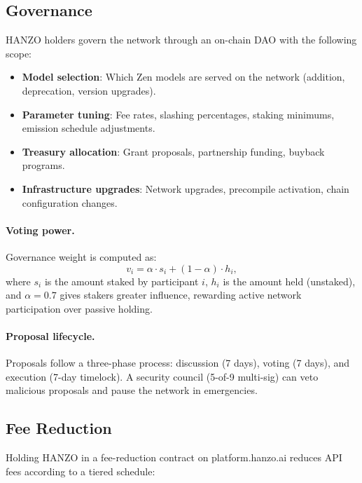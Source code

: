 \subsection{Governance}
\label{sec:governance}

HANZO holders govern the network through an on-chain DAO with the following
scope:

\begin{itemize}[leftmargin=1.1em]
    \item \textbf{Model selection}: Which Zen models are served on the network
    (addition, deprecation, version upgrades).
    \item \textbf{Parameter tuning}: Fee rates, slashing percentages, staking
    minimums, emission schedule adjustments.
    \item \textbf{Treasury allocation}: Grant proposals, partnership funding,
    buyback programs.
    \item \textbf{Infrastructure upgrades}: Network upgrades, precompile
    activation, chain configuration changes.
\end{itemize}

\paragraph{Voting power.} Governance weight is computed as:
\begin{equation}
v_i = \alpha \cdot s_i + (1 - \alpha) \cdot h_i,
\end{equation}
where $s_i$ is the amount staked by participant $i$, $h_i$ is the amount held
(unstaked), and $\alpha = 0.7$ gives stakers greater influence, rewarding active
network participation over passive holding.

\paragraph{Proposal lifecycle.} Proposals follow a three-phase process:
discussion (7 days), voting (7 days), and execution (7-day timelock). A security
council (5-of-9 multi-sig) can veto malicious proposals and pause the network in
emergencies.

\subsection{Fee Reduction}
\label{sec:fees}

Holding HANZO in a fee-reduction contract on platform.hanzo.ai reduces API fees
according to a tiered schedule:

